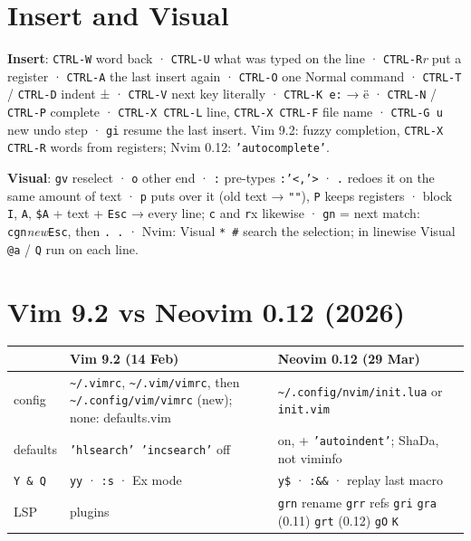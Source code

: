 \documentclass[8pt]{extarticle}
\newcommand\ct[1]{\texttt{#1}}
\newcommand\tl{\textasciitilde}
\begin{document}
\begin{multicols}{2}
\section{Insert and Visual}
\textbf{Insert}: \ct{CTRL-W} word back · \ct{CTRL-U} what was typed on the line ·
\ct{CTRL-R}\emph{r} put a register · \ct{CTRL-A} the last insert again · \ct{CTRL-O} one Normal
command · \ct{CTRL-T} / \ct{CTRL-D} indent ± · \ct{CTRL-V} next key literally · \ct{CTRL-K e:} →
ë · \ct{CTRL-N} / \ct{CTRL-P} complete · \ct{CTRL-X CTRL-L} line, \ct{CTRL-X CTRL-F} file name ·
\ct{CTRL-G u} new undo step · \ct{gi} resume the last insert. Vim 9.2: fuzzy completion,
\ct{CTRL-X CTRL-R} words from registers; Nvim 0.12: \texttt{'autocomplete'}.\par
\textbf{Visual}: \ct{gv} reselect · \ct{o} other end · \ct{:} pre-types \ct{:'<,'>} · \ct{.}
redoes it on the same amount of text · \ct{p} puts over it (old text → \ct{""}), \ct{P} keeps
registers · block \ct{I}, \ct{A}, \ct{\$A} + text + \ct{Esc} → every line; \ct{c} and
\ct{r}x likewise · \ct{gn} = next match: \ct{cgn}\emph{new}\ct{Esc}, then \ct{. .} · Nvim:
Visual \ct{* \#} search the selection; in linewise Visual \ct{@a} / \ct{Q} run on each line.

\section{Vim 9.2 vs Neovim 0.12 (2026)}
{\scriptsize\setlength{\tabcolsep}{2pt}
\begin{tabular}{@{}L{10mm}L{33mm}L{34mm}@{}}
\toprule
& \textbf{Vim 9.2} (14 Feb) & \textbf{Neovim 0.12} (29 Mar)\\
\midrule
config & \ct{\tl/.vimrc}, \ct{\tl/.vim/vimrc}, then \ct{\tl/.config/vim/vimrc} (new); none: defaults.vim & \ct{\tl/.config/nvim/init.lua} or \ct{init.vim}\\
defaults & \texttt{'hlsearch' 'incsearch'} off & on, + \texttt{'autoindent'}; ShaDa, not viminfo\\
\ct{Y \& Q} & \ct{yy} · \ct{:s} · Ex mode & \ct{y\$} · \ct{:\&\&} · replay last macro\\
LSP & plugins & \ct{grn} rename \ct{grr} refs \ct{gri} \ct{gra} (0.11) \ct{grt} (0.12) \ct{gO} \ct{K}\\
\bottomrule
\end{tabular}}

\columnbreak


\end{multicols}
\end{document}
